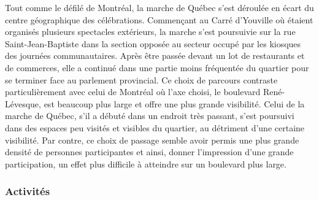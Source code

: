 Tout comme le défilé de Montréal, la marche de Québec s'est déroulée en écart du centre géographique des célébrations.
Commençant au Carré d'Youville où étaient organisés plusieurs spectacles extérieurs, la marche s'est poursuivie sur la rue Saint-Jean-Baptiste dans la section opposée au secteur occupé par les kiosques des journées communautaires.
Après être passée devant un lot de restaurants et de commerces, elle a continué dans une partie moins fréquentée du quartier pour se terminer face au parlement provincial.
Ce choix de parcours contraste particulièrement avec celui de Montréal où l'axe choisi, le boulevard René-Lévesque, est beaucoup plus large et offre une plus grande visibilité.
Celui de la marche de Québec, s'il a débuté dans un endroit très passant, s'est poursuivi dans des espaces peu visités et visibles du quartier, au détriment d'une certaine visibilité.
Par contre, ce choix de passage semble avoir permis une plus grande densité de personnes participantes et ainsi, donner l'impression d'une grande participation, un effet plus difficile à atteindre sur un boulevard plus large.

\subsubsection{Activités}
\label{subsec:activitesfiertemontreal}




